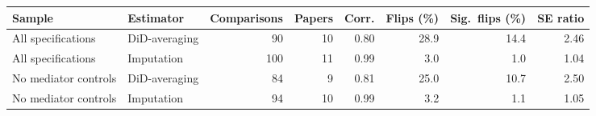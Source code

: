 \begin{tabular}{llrrrrrr}
\toprule
Sample & Estimator & Comparisons & Papers & Corr. & Flips (\%) & Sig.\ flips (\%) & SE ratio \\
\midrule
All specifications & DiD-averaging & 90 & 10 & 0.80 & 28.9 & 14.4 & 2.46 \\
All specifications & Imputation & 100 & 11 & 0.99 & 3.0 & 1.0 & 1.04 \\
No mediator controls & DiD-averaging & 84 & 9 & 0.81 & 25.0 & 10.7 & 2.50 \\
No mediator controls & Imputation & 94 & 10 & 0.99 & 3.2 & 1.1 & 1.05 \\
\bottomrule
\end{tabular}

